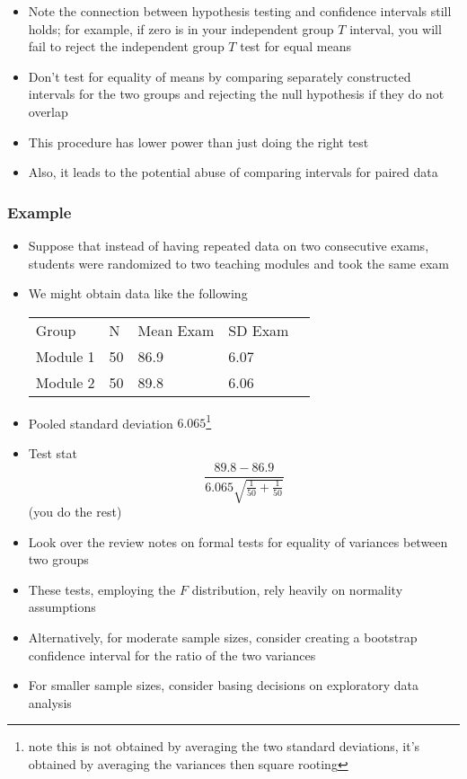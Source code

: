 \documentclass[aspectratio=169]{beamer}
\begin{document}
\begin{frame}
\begin{itemize}
\item Note the connection between hypothesis testing and confidence
  intervals still holds; for example, if zero is in your independent 
  group $T$ interval, you will fail to reject the independent group $T$
  test for equal means
\item Don't test for equality of means by comparing separately
  constructed intervals for the two groups and rejecting the null
  hypothesis if they do not overlap
\item This procedure has lower power than just doing the right test
\item Also, it leads to the potential abuse of comparing intervals for
  paired data
\end{itemize}
\end{frame}

\begin{frame}\frametitle{Example}
  \begin{itemize}
     \item Suppose that instead of having repeated data on two consecutive exams,
       students were randomized to two teaching modules and took the same exam
     \item We might obtain data like the following
       \begin{center}
       \begin{tabular}{lllll}
         Group    & N  & Mean Exam & SD Exam \\
         Module 1 & 50 & 86.9 & 6.07 \\
         Module 2 & 50 & 89.8 & 6.06 \\ 
      \end{tabular}         
       \end{center}
     \item Pooled standard deviation $6.065$\footnote{note this is not obtained by averaging the two standard deviations, it's obtained by averaging the variances then square rooting}
     \item Test stat $$\frac{89.8 - 86.9}{6.065\sqrt{\frac{1}{50}+\frac{1}{50}}}$$
       (you do the rest)
  \end{itemize}
\end{frame}

\begin{frame}
\begin{itemize}
\item Look over the review notes on formal tests for equality of
  variances between two groups
\item These tests, employing the $F$ distribution, rely heavily on 
  normality assumptions
\item Alternatively, for moderate sample sizes, consider creating a
  bootstrap confidence interval for the ratio of the two variances
\item For smaller sample sizes, consider basing decisions on exploratory
  data analysis
\end{itemize}
\end{frame}
\end{document}
